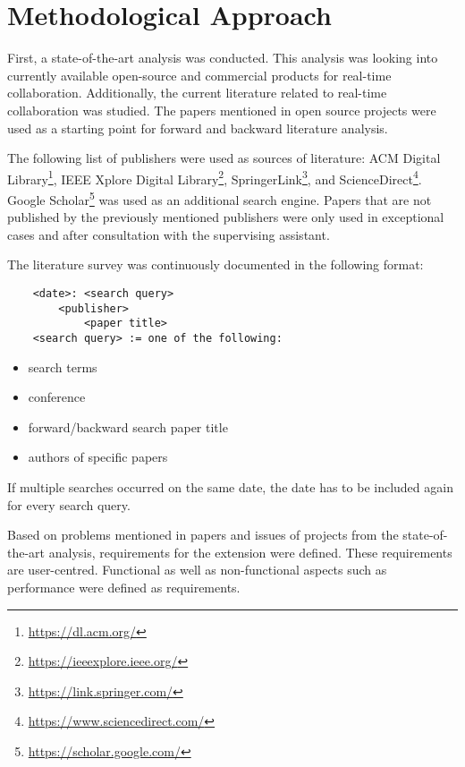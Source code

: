 \chapter{Methodological Approach}

First, a state-of-the-art analysis was conducted. This analysis was looking into currently available open-source and commercial products for real-time collaboration. 
Additionally, the current literature related to real-time collaboration was studied.
The papers mentioned in open source projects were used as a starting point for forward and backward literature analysis.


The following list of publishers were used as sources of literature: ACM Digital Library\footnote{\href{https://dl.acm.org/}{https://dl.acm.org/}}, IEEE Xplore Digital Library\footnote{\href{https://ieeexplore.ieee.org/}{https://ieeexplore.ieee.org/}}, SpringerLink\footnote{\href{https://link.springer.com/}{https://link.springer.com/}}, and ScienceDirect\footnote{\href{https://www.sciencedirect.com/}{https://www.sciencedirect.com/}}. Google Scholar\footnote{\href{https://scholar.google.com/}{https://scholar.google.com/}} was used as an additional search engine. Papers that are not published by the previously mentioned publishers were only used in exceptional cases and after consultation with the supervising assistant.


The literature survey was continuously documented in the following format:

\begin{lstlisting}
	<date>: <search query>
		<publisher>
			<paper title>
	<search query> := one of the following:
\end{lstlisting}

\begin{itemize}
    \item search terms
    \item conference
    \item forward/backward search paper title
    \item authors of specific papers 
\end{itemize}
If multiple searches occurred on the same date, the date has to be included again for every search query.

Based on problems mentioned in papers and issues of projects from the state-of-the-art analysis, requirements for the extension were defined.
These requirements are user-centred.
Functional as well as non-functional aspects such as performance were defined as requirements.

